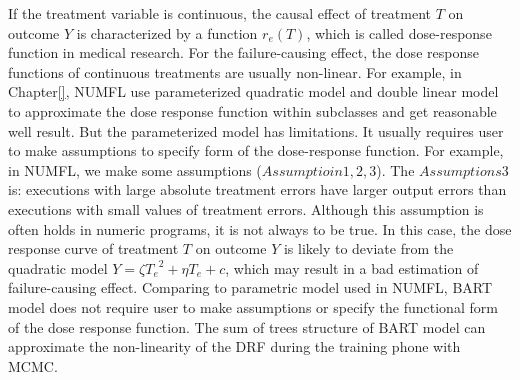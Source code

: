 If the treatment variable is continuous, the causal effect of treatment $T$ on outcome $Y$ is characterized by a function $r_e (T)$, which is called dose-response function in medical research. For the failure-causing effect, the dose response functions of continuous treatments are usually non-linear. For example, in Chapter\ref{}, NUMFL use parameterized quadratic model and double linear model to approximate the dose response function within subclasses and get reasonable well result. But the parameterized model has limitations. It usually requires user to make assumptions to specify form of the dose-response function.  For example, in NUMFL, we make some assumptions ($Assumptioin 1, 2, 3$).  The  $Assumptions3$ is: executions with large absolute treatment errors have larger output errors than executions with small values of treatment errors.  Although this assumption is often holds in numeric programs, it is not always to be true. In this case,  the dose response curve of treatment $T$ on outcome $Y$ is likely to deviate from the quadratic model $Y = \zeta {T_e}^2 + \eta {T_e} + c$, which may result in a bad estimation of failure-causing effect. Comparing to parametric model used in NUMFL, BART model does not require user to make assumptions or specify the functional form of the dose response function. The sum of trees structure of BART model can approximate the non-linearity of the DRF during the training phone with MCMC. 

